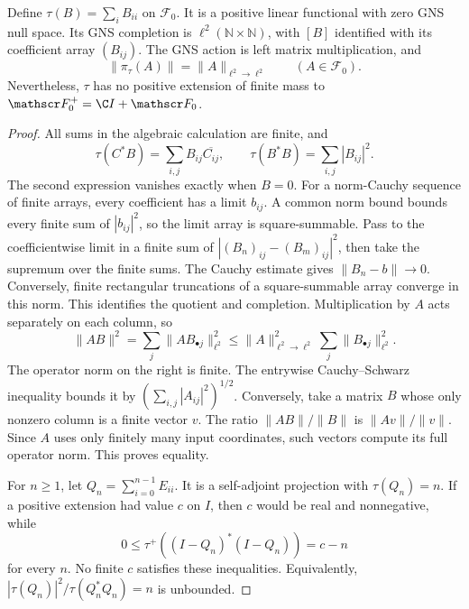 \begin{proposition}
\label{prop:weil-matrix-trace}
Define $\tau(B)=\sum_i B_{ii}$ on $\mathscr F_0$.
It is a positive linear functional with zero GNS null space.
Its GNS completion is $\ell^2(\mathbb N\times\mathbb N)$, with $[B]$
identified with its coefficient array $(B_{ij})$.
The GNS action is left matrix multiplication, and
\[
 \|\pi_\tau(A)\|=\|A\|_{\ell^2\to\ell^2}
 \qquad(A\in\mathscr F_0).
\]
Nevertheless, $\tau$ has no positive extension of finite mass to
$\mathscr F_0^+=\C I+\mathscr F_0$.
\end{proposition}
\begin{proof}
All sums in the algebraic calculation are finite, and
\[
 \tau(C^*B)=\sum_{i,j}B_{ij}\overline{C_{ij}},\qquad
 \tau(B^*B)=\sum_{i,j}|B_{ij}|^2.
\]
The second expression vanishes exactly when $B=0$.
For a norm-Cauchy sequence of finite arrays, every coefficient has a
limit $b_{ij}$.  A common norm bound bounds every finite sum of
$|b_{ij}|^2$, so the limit array is square-summable.
Pass to the coefficientwise limit in a finite sum of
$|(B_n)_{ij}-(B_m)_{ij}|^2$, then take the supremum over the finite sums.
The Cauchy estimate gives $\|B_n-b\|\to0$.
Conversely, finite rectangular truncations of a square-summable array
converge in this norm.  This identifies the quotient and completion.
Multiplication by $A$ acts separately on each column, so
\[
 \|AB\|^2=\sum_j\|A B_{\bullet j}\|_{\ell^2}^2
       \leq\|A\|_{\ell^2\to\ell^2}^2\sum_j\|B_{\bullet j}\|_{\ell^2}^2.
\]
The operator norm on the right is finite.  The entrywise
Cauchy--Schwarz inequality bounds it by
$(\sum_{i,j}|A_{ij}|^2)^{1/2}$.
Conversely, take a matrix $B$ whose only nonzero column is a finite
vector $v$.  The ratio $\|AB\|/\|B\|$ is $\|Av\|/\|v\|$.
Since $A$ uses only finitely many input coordinates, such vectors
compute its full operator norm.  This proves equality.

For $n\geq1$, let $Q_n=\sum_{i=0}^{n-1}E_{ii}$.
It is a self-adjoint projection with $\tau(Q_n)=n$.
If a positive extension had value $c$ on $I$, then $c$ would be real
and nonnegative, while
\[
 0\leq\tau^+((I-Q_n)^*(I-Q_n))=c-n
\]
for every $n$.  No finite $c$ satisfies these inequalities.
Equivalently,
$|\tau(Q_n)|^2/\tau(Q_n^*Q_n)=n$ is unbounded.
\end{proof}

